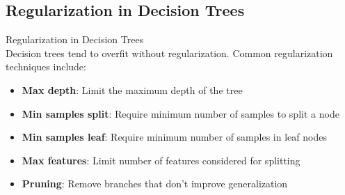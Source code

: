 \subsection{Regularization in Decision Trees}

\begin{concept}{Regularization in Decision Trees}\\
Decision trees tend to overfit without regularization. Common regularization techniques include:
\begin{itemize}
    \item \textbf{Max depth}: Limit the maximum depth of the tree
    \item \textbf{Min samples split}: Require minimum number of samples to split a node
    \item \textbf{Min samples leaf}: Require minimum number of samples in leaf nodes
    \item \textbf{Max features}: Limit number of features considered for splitting
    \item \textbf{Pruning}: Remove branches that don't improve generalization
\end{itemize}
\end{concept}

